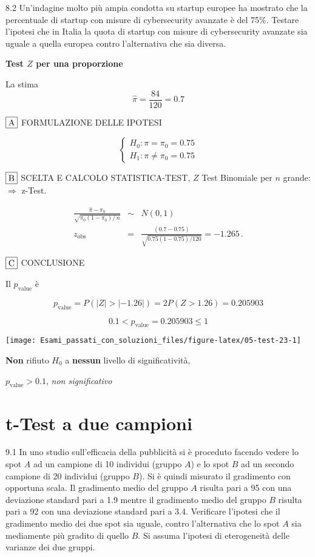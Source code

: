 \documentclass[
  11pt,
]{book}
\theoremstyle{mytheoremstyle}
\theoremstyle{mydefstyle}
\newenvironment{sol}
  {
  \begin{tcolorbox}[enhanced,breakable,arc=0.1mm,boxrule=1pt,colback=white,colframe=iblue,
  title=\bf \fontfamily{lmss}\selectfont \hspace{.5 cm} Soluzione,drop fuzzy shadow]

}{
\end{tcolorbox}
  }
\begin{document}
8.2 Un'indagine molto più ampia condotta su startup europee ha mostrato che la percentuale di startup con misure di cybersecurity avanzate è del 75\%. Testare l'ipotesi che in Italia la quota di startup con misure di cybersecurity avanzate sia uguale a quella europea contro l'alternativa che sia diversa.

\begin{sol}
\textbf{Test \(Z\) per una proporzione}

La stima
\[\hat\pi=\frac { 84 } { 120 }= 0.7  \]

\(\fbox{A}\) FORMULAZIONE DELLE IPOTESI

\[\begin{cases}
   H_0: \pi = \pi_0=0.75 \\
   H_1: \pi \neq \pi_0=0.75 
   \end{cases}\]

\(\fbox{B}\) SCELTA E CALCOLO STATISTICA-TEST, \(Z\)
Test Binomiale per \(n\) grande: \(\Rightarrow\) z-Test.

\begin{eqnarray*}
   \frac{\hat\pi - \pi_{0}} {\sqrt {\pi_0(1-\pi_0)/\,n}}&\sim&N(0,1)\\
   z_{\text{obs}}
   &=& \frac{ ( 0.7 -  0.75 )} {\sqrt{ 0.75 (1- 0.75 )/ 120 }}
   =   -1.265 \,.
   \end{eqnarray*}

\(\fbox{C}\) CONCLUSIONE

Il \(p_{\text{value}}\) è

\[ p_{\text{value}} = P(|Z|>|-1.26|)=2P(Z>1.26)=0.205903 \]

\[
 0.1 < p_\text{value}= 0.205903 \leq 1 
\]

\begin{center}\texttt{[image: Esami\_passati\_con\_soluzioni\_files/figure-latex/05-test-23-1]} \end{center}

\textbf{Non} rifiuto \(H_0\) a \textbf{nessun}
livello di significatività,

\(p_\text{value}>0.1\),
\emph{non significativo}

\end{sol}

\section{t-Test a due campioni}\label{t-test-a-due-campioni}

9.1 In uno studio sull'efficacia della pubblicità
si è proceduto facendo vedere lo spot \(A\) ad un campione di 10
individui (gruppo \(A\)) e lo spot \(B\) ad un secondo campione di 20
individui (gruppo \(B\)).
Si è quindi misurato il gradimento con opportuna scala.
Il gradimento medio del gruppo \(A\) risulta pari a 95 con una
deviazione standard pari a 1.9 mentre il gradimento medio del
gruppo \(B\) risulta pari a 92 con una deviazione standard pari
a 3.4.
Verificare l'ipotesi che il gradimento medio dei due spot sia uguale, contro
l'alternativa che lo spot \(A\) sia mediamente più gradito
di quello \(B\).
Si assuma l'ipotesi di eterogeneità delle varianze dei due
gruppi.
\end{document}
